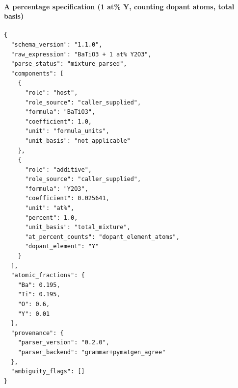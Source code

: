 \paragraph{A percentage specification (1 at\% Y, counting dopant atoms, total basis)}
\begin{verbatim}
{
  "schema_version": "1.1.0",
  "raw_expression": "BaTiO3 + 1 at% Y2O3",
  "parse_status": "mixture_parsed",
  "components": [
    {
      "role": "host",
      "role_source": "caller_supplied",
      "formula": "BaTiO3",
      "coefficient": 1.0,
      "unit": "formula_units",
      "unit_basis": "not_applicable"
    },
    {
      "role": "additive",
      "role_source": "caller_supplied",
      "formula": "Y2O3",
      "coefficient": 0.025641,
      "unit": "at%",
      "percent": 1.0,
      "unit_basis": "total_mixture",
      "at_percent_counts": "dopant_element_atoms",
      "dopant_element": "Y"
    }
  ],
  "atomic_fractions": {
    "Ba": 0.195,
    "Ti": 0.195,
    "O": 0.6,
    "Y": 0.01
  },
  "provenance": {
    "parser_version": "0.2.0",
    "parser_backend": "grammar+pymatgen_agree"
  },
  "ambiguity_flags": []
}
\end{verbatim}
